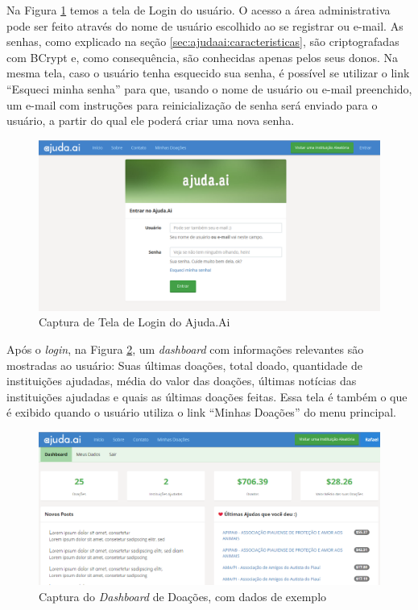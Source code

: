 Na Figura \ref{fig:ss_ajudaai_07} temos a tela de Login do usuário. O acesso a área administrativa pode ser feito através do nome de usuário escolhido ao se registrar ou e-mail. As senhas, como explicado na seção \ref{sec:ajudaai:caracteristicas}, são criptografadas com BCrypt e, como consequência, são conhecidas apenas pelos seus donos. Na mesma tela, caso o usuário tenha esquecido sua senha, é possível se utilizar o link ``Esqueci minha senha'' para que, usando o nome de usuário ou e-mail preenchido, um e-mail com instruções para reinicialização de senha será enviado para o usuário, a partir do qual ele poderá criar uma nova senha.

\begin{figure}[H]
	\caption{\label{fig:ss_ajudaai_07}Captura de Tela de Login do Ajuda.Ai}
    \centering
    \includegraphics[scale=0.48]{imagens/screenshot-ajudaai-07.png}
\end{figure}

Após o \emph{login}, na Figura \ref{fig:ss_ajudaai_08}, um \emph{dashboard} com informações relevantes são mostradas ao usuário: Suas últimas doações, total doado, quantidade de instituições ajudadas, média do valor das doações, últimas notícias das instituições ajudadas e quais as últimas doações feitas. Essa tela é também o que é exibido quando o usuário utiliza o link ``Minhas Doações'' do menu principal.

\begin{figure}[H]
	\caption{\label{fig:ss_ajudaai_08}Captura do \emph{Dashboard} de Doações, com dados de exemplo}
    \centering
    \includegraphics[scale=0.5]{imagens/screenshot-ajudaai-08.png}
\end{figure}










